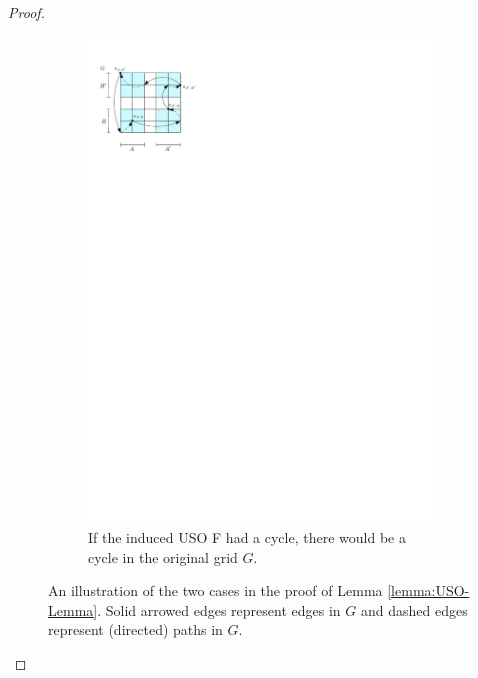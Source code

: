 \documentclass[runningheads,a4paper]{llncs}
\begin{document}
\begin{proof}
\begin{figure}
\begin{subfigure}[t]{0.45\textwidth}
\includegraphics{product_lemma_cycle.pdf}
\caption{\small If the induced USO F had a cycle, there would be a cycle in the original grid $G$.}
\label{fig:InducedUSOcycle}
\end{subfigure}
\caption{An illustration of the two cases in the proof of Lemma \ref{lemma:USO-Lemma}. Solid arrowed edges represent edges in $G$ and dashed edges represent (directed) paths in $G$.}
\label{fig:inducesUSOboth}
\end{figure}

\end{proof}
\end{document}
